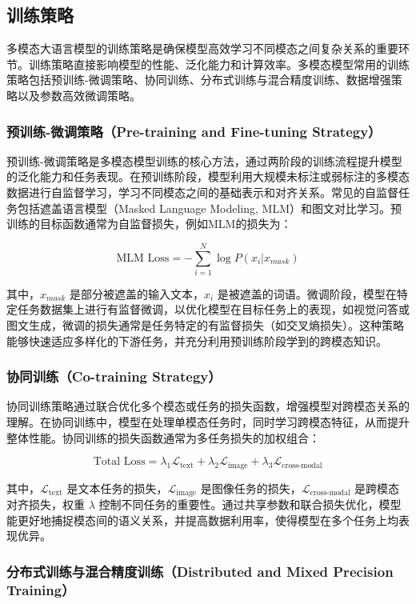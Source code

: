 \documentclass[12pt]{article}
\begin{document}
\subsection{训练策略}
多模态大语言模型的训练策略是确保模型高效学习不同模态之间复杂关系的重要环节。训练策略直接影响模型的性能、泛化能力和计算效率。多模态模型常用的训练策略包括预训练-微调策略、协同训练、分布式训练与混合精度训练、数据增强策略以及参数高效微调策略。
\subsubsection{预训练-微调策略（Pre-training and Fine-tuning Strategy）}


预训练-微调策略是多模态模型训练的核心方法，通过两阶段的训练流程提升模型的泛化能力和任务表现。在预训练阶段，模型利用大规模未标注或弱标注的多模态数据进行自监督学习，学习不同模态之间的基础表示和对齐关系。常见的自监督任务包括遮盖语言模型（Masked Language Modeling, MLM）和图文对比学习。预训练的目标函数通常为自监督损失，例如MLM的损失为：

\[
\text{MLM Loss} = -\sum_{i=1}^{N} \log P(x_i | x_{mask})
\]

其中，\( x_{mask} \) 是部分被遮盖的输入文本，\( x_i \) 是被遮盖的词语。微调阶段，模型在特定任务数据集上进行有监督微调，以优化模型在目标任务上的表现，如视觉问答或图文生成，微调的损失通常是任务特定的有监督损失（如交叉熵损失）。这种策略能够快速适应多样化的下游任务，并充分利用预训练阶段学到的跨模态知识。

\subsubsection{协同训练（Co-training Strategy）}

协同训练策略通过联合优化多个模态或任务的损失函数，增强模型对跨模态关系的理解。在协同训练中，模型在处理单模态任务时，同时学习跨模态特征，从而提升整体性能。协同训练的损失函数通常为多任务损失的加权组合：

\[
\text{Total Loss} = \lambda_1 \mathcal{L}_{\text{text}} + \lambda_2 \mathcal{L}_{\text{image}} + \lambda_3 \mathcal{L}_{\text{cross-modal}}
\]

其中，\( \mathcal{L}_{\text{text}} \) 是文本任务的损失，\( \mathcal{L}_{\text{image}} \) 是图像任务的损失，\( \mathcal{L}_{\text{cross-modal}} \) 是跨模态对齐损失，权重 \( \lambda \) 控制不同任务的重要性。通过共享参数和联合损失优化，模型能更好地捕捉模态间的语义关系，并提高数据利用率，使得模型在多个任务上均表现优异。

\subsubsection{分布式训练与混合精度训练（Distributed and Mixed Precision Training）}
\end{document}
